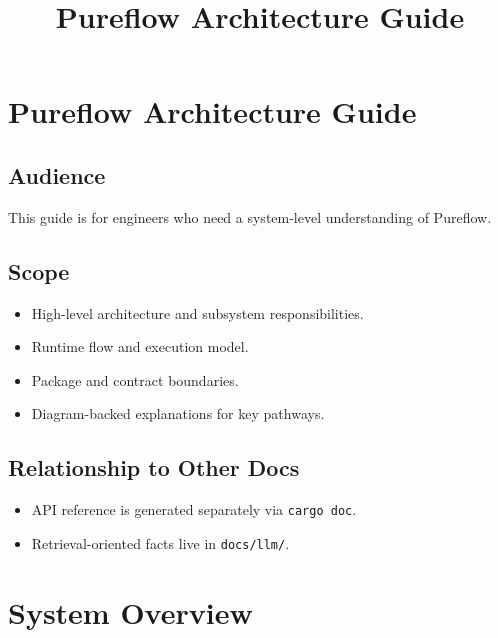 \documentclass[
  letterpaper,
]{report}
\title{Pureflow Architecture Guide}
\author{}
\date{}
\providecommand{\tightlist}{%
  \setlength{\itemsep}{0pt}\setlength{\parskip}{0pt}}
\renewcommand*\contentsname{Table of contents}
\newcommand\contentsname{Table of contents}
\begin{document}
\maketitle

\renewcommand*\contentsname{Table of contents}
{
\hypersetup{linkcolor=}
\setcounter{tocdepth}{2}
\tableofcontents
}


\chapter{Pureflow Architecture Guide}\label{conduit-architecture-guide}

\section{Audience}\label{audience}

This guide is for engineers who need a system-level understanding of
Pureflow.

\section{Scope}\label{scope}

\begin{itemize}
\tightlist
\item
  High-level architecture and subsystem responsibilities.
\item
  Runtime flow and execution model.
\item
  Package and contract boundaries.
\item
  Diagram-backed explanations for key pathways.
\end{itemize}

\section{Relationship to Other Docs}\label{relationship-to-other-docs}

\begin{itemize}
\tightlist
\item
  API reference is generated separately via \texttt{cargo\ doc}.
\item
  Retrieval-oriented facts live in \texttt{docs/llm/}.
\end{itemize}


\chapter{System Overview}\label{system-overview}
\end{document}
